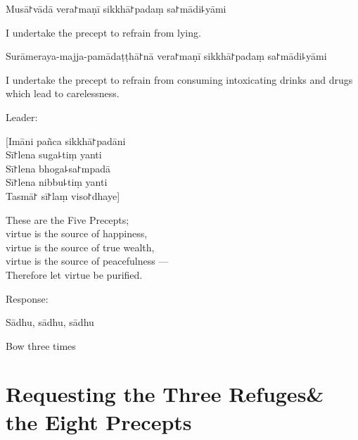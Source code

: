 \clearpage

\begin{precept}
  \setcounter{enumi}{3}
  \item Musā꜓vādā vera꜓maṇī sikkhā꜓padaṃ sa꜓mādi꜕yāmi
\end{precept}

\begin{english}
  I undertake the precept to refrain from lying.
\end{english}

\begin{precept}
  \setcounter{enumi}{4}
  \item Surāmeraya-majja-pamādaṭṭhā꜓nā vera꜓maṇī sikkhā꜓padaṃ sa꜓mādi꜕yāmi
\end{precept}

\begin{english}
  I undertake the precept to refrain from consuming intoxicating drinks and drugs which lead to carelessness.
\end{english}

\begin{instruction}
  Leader:
\end{instruction}

[Imāni pañca sikkhā꜓padāni\\
Sī꜓lena suga꜕tiṃ yanti\\
Sī꜓lena bhoga꜕sa꜓mpadā\\
Sī꜓lena nibbu꜕tiṃ yanti\\
Tasmā꜓ sī꜓laṃ viso꜓dhaye]

\begin{english}
  These are the Five Precepts;\\
  virtue is the source of happiness,\\
  virtue is the source of true wealth,\\
  virtue is the source of peacefulness ---\\
  Therefore let virtue be purified.
\end{english}

\begin{instruction}
  Response:
\end{instruction}

Sādhu, sādhu, sādhu

\begin{instruction}
  Bow three times
\end{instruction}

\clearpage
\chapter[Three Refuges \& the Eight Precepts]{Requesting the Three Refuges\newline \& the Eight Precepts}%

